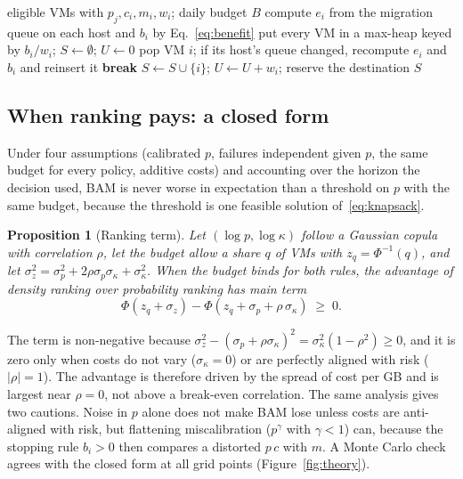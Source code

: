 \documentclass[pdflatex,sn-mathphys-num,iicol]{sn-jnl}
\theoremstyle{thmstyleone}%
\newtheorem{proposition}{Proposition}%
\theoremstyle{thmstylethree}%
\begin{document}
\begin{algorithm}[htbp]
\caption{Budget-aware migration (BAM, P4), one daily decision}\label{alg:bam}
\begin{algorithmic}[1]
\Require eligible VMs with $p_j, c_i, m_i, w_i$; daily budget $B$
\State compute $e_i$ from the migration queue on each host and $b_i$ by Eq.~\eqref{eq:benefit}
\State put every VM in a max-heap keyed by $b_i / w_i$; $S \gets \emptyset$; $U \gets 0$
  \State pop VM $i$; if its host's queue changed, recompute $e_i$ and $b_i$ and reinsert it
   \textbf{break} \EndIf
    \State $S \gets S \cup \{i\}$; $U \gets U + w_i$; reserve the destination
  \EndIf
\EndWhile
\State \Return $S$
\end{algorithmic}
\end{algorithm}

\subsection{When ranking pays: a closed form}\label{sec:theory}

Under four assumptions (calibrated $p$, failures independent given $p$, the same budget for every
policy, additive costs) and accounting over the horizon the decision used, BAM is never worse in
expectation than a threshold on $p$ with the same budget, because the threshold is one feasible
solution of~\eqref{eq:knapsack}.

\begin{proposition}[Ranking term]\label{prop:rank}
Let $(\log p, \log \kappa)$ follow a Gaussian copula with correlation $\rho$, let the budget allow a
share $q$ of VMs with $z_q = \Phi^{-1}(q)$, and let
$\sigma_z^2 = \sigma_p^2 + 2\rho\sigma_p\sigma_\kappa + \sigma_\kappa^2$. When the budget binds for
both rules, the advantage of density ranking over probability ranking has main term
\begin{equation}
\Phi(z_q + \sigma_z) - \Phi(z_q + \sigma_p + \rho\,\sigma_\kappa) \;\ge\; 0 .
\label{eq:rankterm}
\end{equation}
\end{proposition}

The term is non-negative because
$\sigma_z^2 - (\sigma_p + \rho\sigma_\kappa)^2 = \sigma_\kappa^2 (1-\rho^2) \ge 0$, and it is zero
only when costs do not vary ($\sigma_\kappa = 0$) or are perfectly aligned with risk
($|\rho| = 1$). The advantage is therefore driven by the spread of cost per GB and is largest near
$\rho = 0$, not above a break-even correlation. The same analysis gives two cautions. Noise in $p$
alone does not make BAM lose unless costs are anti-aligned with risk, but flattening
miscalibration ($p^\gamma$ with $\gamma < 1$) can, because the stopping rule $b_i > 0$ then compares a
distorted $p\,c$ with $m$. A Monte Carlo check agrees with the closed form at all
\VTheoryPoints{} grid points (Figure~\ref{fig:theory}).
\end{document}
